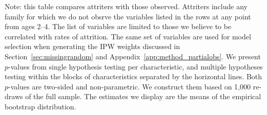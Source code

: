 \begin{table}[H]
\begin{threeparttable}
\begin{tabular}{cccccccc}
  \hline\hline
  \end{tabular}
    \begin{tablenotes}
    \scriptsize
    \item 
        Note: this table compares attriters with those observed. Attriters include any family
        for which we do not obsrve the variables listed in the rows at any point from ages 2--4.
        The list of variables are limited to 
        those we believe to be correlated with rates of attrition. The same set of variables are used for 
        model selection when generating the IPW weights discussed in Section~\ref{sec:missingrandom} and 
        Appendix~\ref{app:method_partialobs}. We present $p$-values from single hypothesis testing
        per characteristic, and multiple hypotheses testing within the blocks of characteristics separated
        by the horizontal lines. Both $p$-values 
        are two-sided and non-parametric. We construct them based on 1,000 re-draws of the full sample. 
        The estimates we display are the means of the empirical bootstrap distribution. 
        
    \end{tablenotes}
  \end{threeparttable}

\end{table}